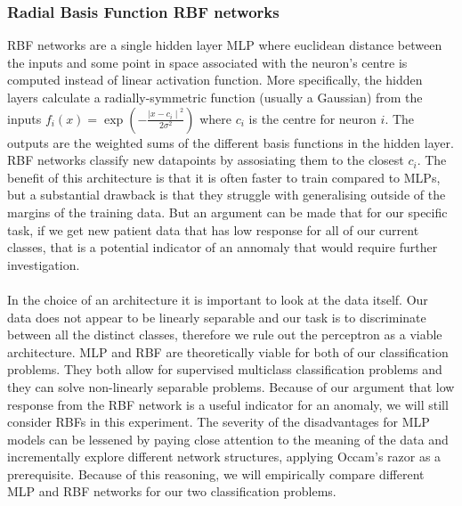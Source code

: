\documentclass[11pt,a4paper]{article}
\begin{document}


\subsubsection{Radial Basis Function RBF networks}
RBF networks are a single hidden layer MLP where euclidean distance between the inputs and some point in space associated with the neuron's centre is computed instead of linear activation function. More specifically, the hidden layers calculate a radially-symmetric function (usually a Gaussian) from the inputs \(f_i(x) = \exp \left(-\frac{{\mid x - c_i \mid}^2}{2 \sigma^2} \right) \) where \(c_i\) is the centre for neuron \(i\). The outputs are the weighted sums of the different basis functions in the hidden layer.
RBF networks classify new datapoints by assosiating them to the closest \(c_i\). The benefit of this architecture is that it is often faster to train compared to MLPs, but a substantial drawback is that they struggle with generalising outside of the margins of the training data. But an argument can be made that for our specific task, if we get new patient data that has low response for all of our current classes, that is a potential indicator of an annomaly that would require further investigation.

\paragraph{}
In the choice of an architecture it is important to look at the data itself. Our data does not appear to be linearly separable and our task is to discriminate between all the distinct classes, therefore we rule out the perceptron as a viable architecture.
MLP and RBF are theoretically viable for both of our classification problems. They both allow for supervised multiclass classification problems and they can solve non-linearly separable problems. Because of our argument that low response from the RBF network is a useful indicator for an anomaly, we will still consider RBFs in this experiment. The severity of the disadvantages for MLP models can be lessened by paying close attention to the meaning of the data and incrementally explore different network structures, applying Occam's razor as a prerequisite. Because of this reasoning, we will empirically compare different MLP and RBF networks for our two classification problems.
\end{document}
